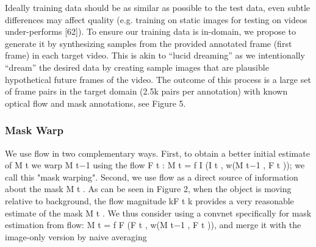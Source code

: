 Ideally training data should be as similar as possible to the test data, even subtle differences may affect quality (e.g. training on static images for testing on videos under-performs [62]). To ensure our training data is in-domain, we propose to generate it by synthesizing samples from the provided annotated frame (ﬁrst frame) in each target video. This is akin to “lucid dreaming” as we intentionally “dream” the desired data by creating sample images that are plausible hypothetical future frames of the video. The outcome of this process is a large set of frame pairs in the target domain (2.5k pairs per annotation) with known optical ﬂow and mask annotations, see Figure 5.

\subsubsection{Mask Warp}
We use ﬂow in two complementary ways. First, to obtain a better initial estimate of M t we warp M t−1 using the ﬂow F t : M t = f I (I t , w(M t−1 , F t )); we call this "mask warping". Second, we use ﬂow as a direct source of information about the mask M t . As can be seen in Figure 2, when the object is moving relative to background, the ﬂow magnitude kF t k provides a very reasonable estimate of the mask M t . We thus consider using a convnet speciﬁcally for mask estimation from ﬂow: M t = f F (F t , w(M t−1 , F t )), and merge it with the image-only version by naive averaging